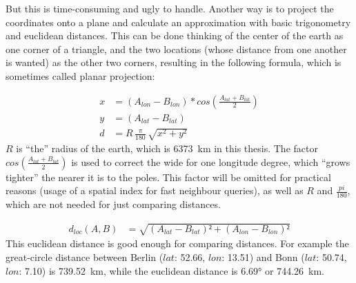 But this is time-consuming and ugly to handle. Another way is to project the coordinates onto a plane and calculate an approximation with basic trigonometry and euclidean distances. This can be done thinking of the center of the earth as one corner of a triangle, and the two locations (whose distance from one another is wanted) as the other two corners, resulting in the following formula, which is sometimes called planar projection:

\begin{align*}
x &= (A_{lon} - B_{lon}) * cos(\frac{A_{lat} + B_{lat}}{2})\\
y &= (A_{lat} - B_{lat})\\
d &= R \, \frac{\pi}{180} \, \sqrt{x^2 + y^2}
\end{align*}
%
$R$ is \enquote{the} radius of the earth, which is 6373~km in this thesis. The factor $cos(\frac{A_{lat} + B_{lat}}{2})$ is used to correct the wide for one longitude degree, which \enquote{grows tighter} the nearer it is to the poles. This factor will be omitted for practical reasons (usage of a spatial index for fast neighbour queries), as well as $R$ and $\frac{pi}{180}$, which are not needed for just comparing distances.

\begin{align}
d_{loc}(A, B) &= \sqrt{(A_{lat} - B_{lat})² + (A_{lon} - B_{lon})²}
\end{align}
%
This euclidean distance is good enough for comparing distances. For example the great-circle distance between Berlin ($lat$: 52.66, $lon$: 13.51) and Bonn ($lat$: 50.74, $lon$: 7.10) is 739.52~km, while the euclidean distance is 6.69° or 744.26~km.




